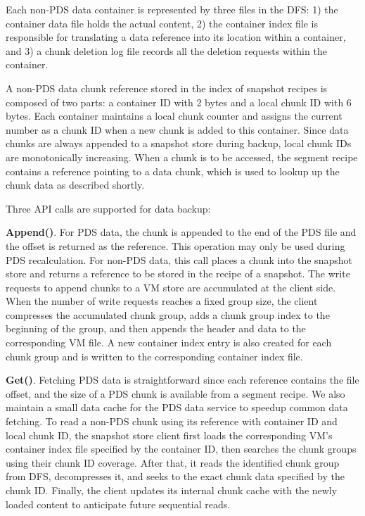 Each non-PDS data container is represented by three files in the DFS:
1) the container data file holds the actual content, 
2) the container index file is responsible for translating a data reference
into its location within a container, and 
3) a chunk deletion log file records all the deletion requests within  the container.

A non-PDS data chunk reference stored in the index of snapshot recipes
is composed of two parts: a container ID with 2 bytes and a local chunk ID with 6 bytes.
Each container maintains a local  chunk counter and assigns the current number 
as a chunk ID  when  a new chunk is added to this  container. 
Since data chunks are always appended to a snapshot store during backup, 
local chunk IDs are monotonically increasing.
When a chunk is to be accessed, the segment recipe contains a reference pointing to  a data chunk, which is used to lookup up the chunk data as described shortly.



Three API calls are supported for data backup:

\noindent\textbf{Append()}. 
For PDS data, the chunk is appended to the end of the PDS file and the offset is returned as the  reference.
This operation  may only be used during PDS recalculation.
For non-PDS data, this call places a chunk into 
the snapshot store and returns a reference to be stored in the recipe of a snapshot. 
The write requests to append chunks to a VM store are accumulated at the client side. 
When the number of write requests reaches a fixed group size, the client compresses
the accumulated   chunk group, adds a chunk group index  to the beginning of the group, and then
appends the header and data  to the corresponding VM file.
A new container  index entry is also created for each chunk group and is written to the corresponding
container index file.

\noindent\textbf{Get()}.
Fetching PDS data is straightforward since each reference contains 
the file offset, and the size of a PDS chunk is available from a segment recipe.
We also maintain a small data cache for the PDS data service to speedup common data fetching.
To read a non-PDS chunk using its reference with container ID and local chunk ID,  the snapshot store client 
first loads the
corresponding VM's container index file specified by the container ID, then searches the chunk
groups  using their  chunk ID coverage.
After that, it reads the identified chunk group from DFS, decompresses it, and seeks to the exact chunk data 
specified by the chunk ID. 
Finally, the client updates its internal chunk cache with the newly loaded content to 
anticipate future sequential reads.

